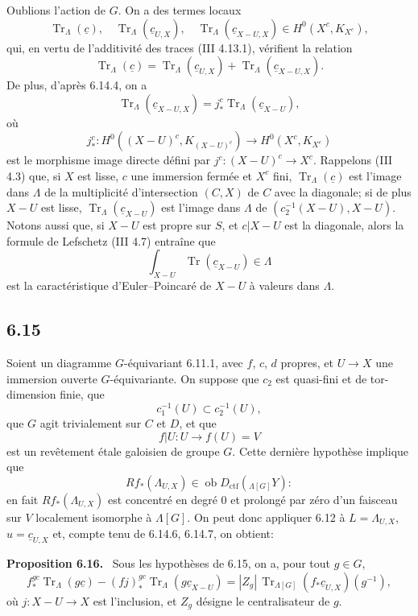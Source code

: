 \documentclass[11pt]{article}
\newenvironment{statement}[1]{\par\medskip\noindent\textbf{#1.}\ }{\par\medskip}
\providecommand{\Tr}{\operatorname{Tr}}
\providecommand{\Tr}{\operatorname{Tr}}
\providecommand{\Ob}{\operatorname{ob}}
\providecommand{\Tr}{\operatorname{Tr}}
\providecommand{\Ob}{\operatorname{ob}}
\providecommand{\Tr}{\operatorname{Tr}}
\providecommand{\Ob}{\operatorname{Ob}}
\providecommand{\Tr}{\operatorname{Tr}}
\providecommand{\Ob}{\operatorname{ob}}
\providecommand{\Ob}{\operatorname{Ob}}
\begin{document}
Oublions l'action de $G$. On a des termes locaux
\begin{equation}
\Tr_{\Lambda}(\underline c),\quad
\Tr_{\Lambda}(\underline c_{U,X}),\quad
\Tr_{\Lambda}(\underline c_{X-U,X})
\in H^0(X^c,K_{X^c}),
\tag{6.14.5}
\end{equation}
qui, en vertu de l'additivité des traces (III 4.13.1), vérifient la relation
\begin{equation}
\Tr_{\Lambda}(\underline c)
=
\Tr_{\Lambda}(\underline c_{U,X})
+
\Tr_{\Lambda}(\underline c_{X-U,X}).
\tag{6.14.6}
\end{equation}
De plus, d'après 6.14.4, on a
\begin{equation}
\Tr_{\Lambda}(\underline c_{X-U,X})
=
j_*^c\Tr_{\Lambda}(\underline c_{X-U}),
\tag{6.14.7}
\end{equation}
où
\[
j_*^c:H^0((X-U)^c,K_{(X-U)^c})\longrightarrow H^0(X^c,K_{X^c})
\]
est le morphisme image directe défini par $j^c:(X-U)^c\to X^c$. Rappelons (III 4.3) que, si $X$ est lisse, $c$ une immersion fermée et $X^c$ fini, $\Tr_{\Lambda}(\underline c)$ est l'image dans $\Lambda$ de la multiplicité d'intersection $(C,X)$ de $C$ avec la diagonale; si de plus $X-U$ est lisse, $\Tr_{\Lambda}(\underline c_{X-U})$ est l'image dans $\Lambda$ de $(c_2^{-1}(X-U),X-U)$. Notons aussi que, si $X-U$ est propre sur $S$, et $c|X-U$ est la diagonale, alors la formule de Lefschetz (III 4.7) entraîne que
\[
\int_{X-U}\Tr(\underline c_{X-U})\in\Lambda
\]
est la caractéristique d'Euler--Poincaré de $X-U$ à valeurs dans $\Lambda$.

\subsection*{6.15}
Soient un diagramme $G$-équivariant 6.11.1, avec $f$, $c$, $d$ propres, et $U\to X$ une immersion ouverte $G$-équivariante. On suppose que $c_2$ est quasi-fini et de tor-dimension finie, que
\[
c_1^{-1}(U)\subset c_2^{-1}(U),
\]
que $G$ agit trivialement sur $C$ et $D$, et que
\[
f|U:U\longrightarrow f(U)=V
\]
est un revêtement étale galoisien de groupe $G$. Cette dernière hypothèse implique que
\[
Rf_*(\Lambda_{U,X})\in\Ob D_{\mathrm{ctf}}({}_{\Lambda[G]}Y):
\]
en fait $Rf_*(\Lambda_{U,X})$ est concentré en degré $0$ et prolongé par zéro d'un faisceau sur $V$ localement isomorphe à $\Lambda[G]$. On peut donc appliquer 6.12 à $L=\Lambda_{U,X}$, $u=\underline c_{U,X}$ et, compte tenu de 6.14.6, 6.14.7, on obtient:

\begin{statement}{Proposition 6.16}
Sous les hypothèses de 6.15, on a, pour tout $g\in G$,
\begin{equation}
f_*^{gc}\Tr_{\Lambda}(g\underline c)
-(fj)_*^{gc}\Tr_{\Lambda}(g\underline c_{X-U})
=
|Z_g|\,\Tr_{\Lambda[G]}(f_*\underline c_{U,X})(g^{-1}),
\tag{6.16.1}
\end{equation}
où $j:X-U\to X$ est l'inclusion, et $Z_g$ désigne le centralisateur de $g$.
\end{statement}
\end{document}
